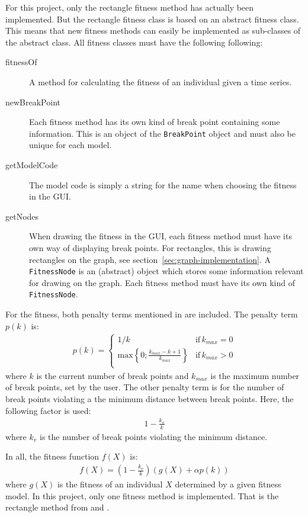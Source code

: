 For this project, only the rectangle fitness method has actually been
implemented. But the rectangle fitness class is based on an abstract fitness
class. This means that new fitness methods can easily be implemented as
sub-classes of the abstract class. All fitness classes must have the following
following: 
\begin{description}
    \item[fitnessOf] A method for calculating the fitness of an individual given
    a time series. 
    \item[newBreakPoint] Each fitness method has its own kind of break point
    containing some information. This is an object of the \texttt{BreakPoint}
    object and must also be unique for each model. 
    \item[getModelCode] The model code is simply a string for the name when
    choosing the fitness in the GUI. 
    \item[getNodes] When drawing the fitness in the GUI, each fitness method
    must have its own way of displaying break points. For rectangles, this is
    drawing rectangles on the graph, see section~\ref{sec:graph-implementation}.
    A \texttt{FitnessNode} is an (abstract) object which stores some information
    relevant for drawing on the graph. Each fitness method must have its own
    kind of \texttt{FitnessNode}. 
\end{description}

For the fitness, both penalty terms mentioned in \cite{doerr2017a} are included.
The penalty term $p(k)$ is:
\begin{align}
    p(k) = \begin{cases}
        1/k & \text{if} \, k_{max} = 0 \\
        \text{max} \left \{ 0;\frac{k_{max} - k + 1}{k_{max}} \right \} & \text{if} \, k_{max} > 0 \\
    \end{cases}
\end{align}
where $k$ is the current number of break points and $k_{max}$ is the maximum
number of break points, set by the user. The other penalty term is for the
number of break points violating a the minimum distance between break points.
Here, the following factor is used:
\begin{align}
    1 - \frac{k_v}{k}
\end{align}
where $k_v$ is the number of break points violating the minimum distance. 

In all, the fitness function $f(X)$ is:
\begin{align}
    f(X) = \left (1 - \frac{k_v}{k} \right ) \left (g(X) + \alpha p(k) \right )
\end{align}
where $g(X)$ is the fitness of an individual $X$ determined by a given fitness
model. In this project, only one fitness method is implemented. That is the
rectangle method from \cite{doerr2017a} and \cite{compstat14}. 


